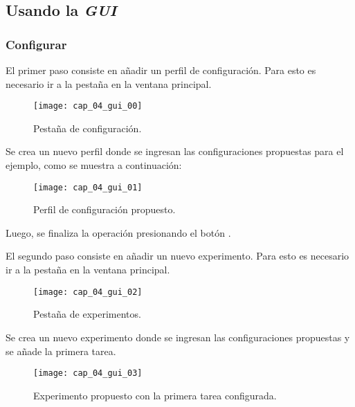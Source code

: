 \documentclass[\main/Main.tex]{subfiles}
\begin{document}
        \newpage
        \subsection{Usando la \textit{GUI}}
            \subsubsection{Configurar}
                El primer paso consiste en añadir un perfil de configuración. Para esto es necesario ir a la pestaña  en la ventana principal.
                \begin{figure}[H]
                    \centering
                    \texttt{[image: cap\_04\_gui\_00]}
                    \caption{Pestaña de configuración.}
                    \label{fig:04_gui_conf00}
                \end{figure}

                Se crea un nuevo perfil donde se ingresan las configuraciones propuestas para el ejemplo, como se muestra a continuación:
                \begin{figure}[H]
                    \centering
                    \texttt{[image: cap\_04\_gui\_01]}
                    \caption{Perfil de configuración propuesto.}
                    \label{fig:04_gui_conf01}
                \end{figure}

                Luego, se finaliza la operación presionando el botón .

                \newpage
                El segundo paso consiste en añadir un nuevo experimento. Para esto es necesario ir a la pestaña  en la ventana principal.
                \begin{figure}[H]
                    \centering
                    \texttt{[image: cap\_04\_gui\_02]}
                    \caption{Pestaña de experimentos.}
                    \label{fig:04_gui_exp01}
                \end{figure} 

                Se crea un nuevo experimento donde se ingresan las configuraciones propuestas y se añade la primera tarea.
                \begin{figure}[H]
                    \centering
                    \texttt{[image: cap\_04\_gui\_03]}
                    \caption{Experimento propuesto con la primera tarea configurada.}
                    \label{fig:04_gui_exp02}
                \end{figure} 
\end{document}

